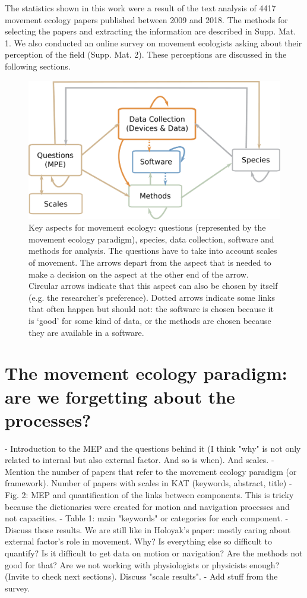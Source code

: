 \documentclass[9pt,twocolumn,twoside,lineno]{pnas-new}
\begin{document}
The statistics shown in this work were a result of the text analysis of 4417 movement ecology papers published between 2009 and 2018. The methods for selecting the papers and extracting the information are described in Supp. Mat. 1. We also conducted an online survey on movement ecologists asking about their perception of the field (Supp. Mat. 2). These perceptions are discussed in the following sections. 

\begin{figure}%
\centering
\includegraphics[width=.8\linewidth]{./img/DimensionsFrame.pdf}
\caption{Key aspects for movement ecology: questions (represented by the movement ecology paradigm), species, data collection, software and methods for analysis. The questions have to take into account scales of movement. The arrows depart from the aspect that is needed to make a decision on the aspect at the other end of the arrow. Circular arrows indicate that this aspect can also be chosen by itself (e.g. the researcher's preference). Dotted arrows indicate some links that often happen but should not: the software is chosen because it is `good' for some kind of data, or the methods are chosen because they are available in a software.}
\label{fig:aspects}
\end{figure}

\section*{The movement ecology paradigm: are we forgetting about the processes?}

- Introduction to the MEP and the questions behind it (I think "why" is not only related to internal but also external factor. And so is when). And scales. 
- Mention the number of papers that refer to the movement ecology paradigm (or framework). Number of papers with scales in KAT (keywords, abstract, title)  
- Fig. 2: MEP and quantification of the links between components. This is tricky because the dictionaries were created for motion and navigation processes and not capacities. 
- Table 1: main "keywords" or categories for each component. 
- Discuss those results. We are still like in Holoyak's paper: mostly caring about external factor's role in movement. Why? Is everything else so difficult to quantify? Is it difficult to get data on motion or navigation? Are the methods not good for that? Are we not working with physiologists or physicists enough? (Invite to check next sections). Discuss "scale results".
- Add stuff from the survey.
\end{document}
